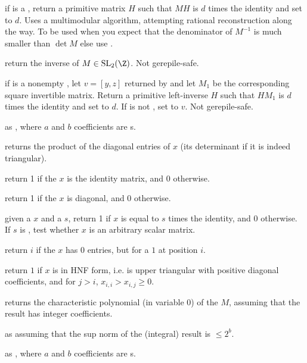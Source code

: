  if  is a ,
return a primitive matrix $H$ such that $M H$ is $d$ times the identity
and set  to $d$. Uses a multimodular algorithm, attempting
rational reconstruction along the way. To be used when you expect that the
denominator of $M^{-1}$ is much smaller than $\det M$ else use .

 return the inverse of $M \in
\text{SL}_2(\Z)$. Not gerepile-safe.

 if  is a nonempty
, let $v = [y,z]$ returned by  and
let $M_1$ be the corresponding square invertible matrix.
Return a primitive left-inverse $H$ such that $H M_1$ is
$d$ times the identity and set  to $d$. If  is not
, set  to $v$. Not gerepile-safe.

 as , where $a$ and $b$
coefficients are s.

 returns the product of the diagonal
entries of $x$ (its determinant if it is indeed triangular).

 return 1 if the  $x$ is the
identity matrix, and 0 otherwise.

 return 1 if the  $x$ is diagonal,
and 0 otherwise.

 given a  $x$ and a
 $s$, return 1 if $x$ is equal to $s$ times the identity, and 0
otherwise. If $s$ is , test whether $x$ is an arbitrary scalar
matrix.

 return $i$ if the  $x$ has $0$ entries,
but for a $1$ at position $i$.

 return $1$ if $x$ is in HNF form, i.e. is upper
triangular with positive diagonal coefficients, and  for $j>i$,
$x_{i,i}>x_{i,j} \ge 0$.


 returns the characteristic polynomial
(in variable $0$) of the  $M$, assuming that the result has integer
coefficients.

 as 
assuming that the sup norm of the (integral) result is $\leq 2^b$.

 as , where $a$ and $b$
coefficients are s.

